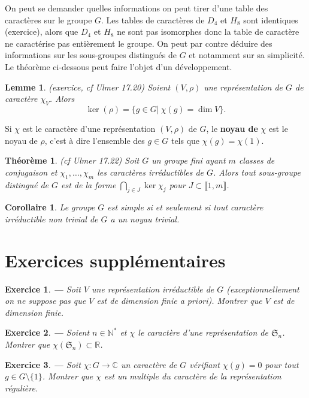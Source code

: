 \documentclass[a4paper]{article}
\newcounter{question}
\newtheorem{enonce}{Exercice}
\newenvironment{exo}[0]{\begin{enonce}{\bf ---}\rm\setcounter{question}{1}}{\end{enonce}}
\theoremstyle{definition} %
\theoremstyle{plain} %
\newtheorem{Lem}[Def]{Lemme} %
\newtheorem{Thm}[Def]{Théorème} %
\newtheorem{Cor}[Def]{Corollaire} %
\theoremstyle{remark} %
\newcommand{\C}{\mathbb{C}}
\newcommand{\N}{\mathbb{N}}
\newcommand{\R}{\mathbb{R}}
\begin{document}
On peut se demander quelles informations on peut tirer d'une table des caractères sur le groupe $G$. Les tables de caractères de $D_4$ et $H_8$ sont identiques (exercice), alors que $D_4$ et $H_8$ ne sont pas isomorphes donc la table de caractère ne caractérise pas entièrement le groupe. On peut par contre déduire des informations sur les sous-groupes distingués de $G$ et notamment sur sa simplicité. Le théorème ci-dessous peut faire l'objet d'un développement.

\begin{Lem}(exercice, cf Ulmer 17.20)
Soient $(V,\rho)$ une représentation de $G$ de caractère $\chi_V$. Alors \[\ker(\rho)=\{g\in G|\ \chi(g)=\dim V\}.\]

\end{Lem}

Si $\chi$ est le caractère d'une représentation $(V,\rho)$ de $G$, le \textbf{noyau de }$\chi$ est le noyau de $\rho$, c'est à dire l'ensemble des $g\in G$ tels que $\chi(g)=\chi(1)$.

\begin{Thm}(cf Ulmer 17.22)
Soit $G$ un groupe fini ayant $m$ classes de conjugaison et $\chi_1,\ldots,\chi_m$ les caractères irréductibles de $G$. Alors tout sous-groupe distingué de $G$ est de la forme $\bigcap_{j\in J} \ker \chi_j$ pour $J\subset \llbracket 1,m\rrbracket$. 
\end{Thm}


\begin{Cor}
Le groupe $G$ est simple si et seulement si tout caractère irréductible non trivial de $G$ a un noyau trivial.
\end{Cor} 

\section{Exercices supplémentaires}

\begin{exo}
Soit $V$ une représentation irréductible de $G$ (exceptionnellement on ne suppose pas que $V$ est de dimension finie a priori). Montrer que $V$ est de dimension finie.
\end{exo}

\begin{exo}
Soient $n\in \N^*$ et $\chi$ le caractère d'une représentation de $\mathfrak{S}_n$. Montrer que $\chi(\mathfrak{S}_n)\subset \R$.
\end{exo}

\begin{exo}
Soit $\chi:G\rightarrow\C$ un caractère de $G$ vérifiant $\chi(g)=0$ pour tout $g\in G\setminus \{1\}$. Montrer que $\chi$ est un multiple du caractère de la représentation régulière.
\end{exo}
\end{document}
